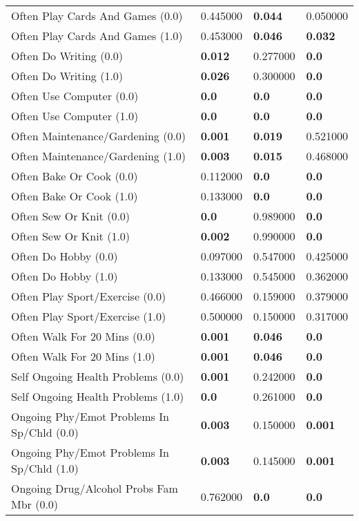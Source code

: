\begin{tabular}{llll}
Often Play Cards And Games (0.0) & 0.445000 & \textbf{0.044} & 0.050000 \\
Often Play Cards And Games (1.0) & 0.453000 & \textbf{0.046} & \textbf{0.032} \\
Often Do Writing (0.0) & \textbf{0.012} & 0.277000 & \textbf{0.0} \\
Often Do Writing (1.0) & \textbf{0.026} & 0.300000 & \textbf{0.0} \\
Often Use Computer (0.0) & \textbf{0.0} & \textbf{0.0} & \textbf{0.0} \\
Often Use Computer (1.0) & \textbf{0.0} & \textbf{0.0} & \textbf{0.0} \\
Often Maintenance/Gardening (0.0) & \textbf{0.001} & \textbf{0.019} & 0.521000 \\
Often Maintenance/Gardening (1.0) & \textbf{0.003} & \textbf{0.015} & 0.468000 \\
Often Bake Or Cook (0.0) & 0.112000 & \textbf{0.0} & \textbf{0.0} \\
Often Bake Or Cook (1.0) & 0.133000 & \textbf{0.0} & \textbf{0.0} \\
Often Sew Or Knit (0.0) & \textbf{0.0} & 0.989000 & \textbf{0.0} \\
Often Sew Or Knit (1.0) & \textbf{0.002} & 0.990000 & \textbf{0.0} \\
Often Do Hobby (0.0) & 0.097000 & 0.547000 & 0.425000 \\
Often Do Hobby (1.0) & 0.133000 & 0.545000 & 0.362000 \\
Often Play Sport/Exercise (0.0) & 0.466000 & 0.159000 & 0.379000 \\
Often Play Sport/Exercise (1.0) & 0.500000 & 0.150000 & 0.317000 \\
Often Walk For 20 Mins (0.0) & \textbf{0.001} & \textbf{0.046} & \textbf{0.0} \\
Often Walk For 20 Mins (1.0) & \textbf{0.001} & \textbf{0.046} & \textbf{0.0} \\
Self Ongoing Health Problems (0.0) & \textbf{0.001} & 0.242000 & \textbf{0.0} \\
Self Ongoing Health Problems (1.0) & \textbf{0.0} & 0.261000 & \textbf{0.0} \\
Ongoing Phy/Emot Problems In Sp/Chld (0.0) & \textbf{0.003} & 0.150000 & \textbf{0.001} \\
Ongoing Phy/Emot Problems In Sp/Chld (1.0) & \textbf{0.003} & 0.145000 & \textbf{0.001} \\
Ongoing Drug/Alcohol Probs Fam Mbr (0.0) & 0.762000 & \textbf{0.0} & \textbf{0.0} \\

\end{tabular}
